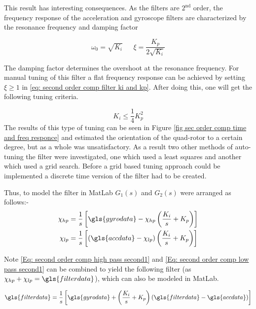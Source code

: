 This result has interesting consequences. As the filters are $2^{\mathrm{nd}}$ order, the frequency response of the acceleration and gyroscope filters are characterized by the resonance frequency and damping factor

\begin{equation}
	\omega_0 = \sqrt{K_i}~~~~~~~ \xi = \frac{K_p}{2\sqrt{K_i}}
	\label{eq: second order comp filter ki and kp}
\end{equation}


The damping factor determines the overshoot at the resonance frequency. For manual tuning of this filter a flat frequency response can be achieved by setting $\xi \geq 1$ in \eqref{eq: second order comp filter ki and kp}. After doing this, one will get the following tuning criteria. 

\begin{equation}
	K_i \leq \frac{1}{4}K_p^2
\end{equation}
The results of this type of tuning can be seen in Figure \ref{fig sec order comp time and freq responce} and estimated the orientation of the quad-rotor to a certain degree, but as a whole was unsatisfactory. As a result two other methods of auto-tuning the filter were investigated, one which used a least squares and another which used a grid search. Before a grid based tuning approach could be implemented a discrete time version of the filter had to be created. 

Thus, to model the filter in MatLab $G_1(s)$ and $G_2(s)$ were arranged as follows:-
\begin{align}
	\chi_{hp} & = \frac{1}{s}\left[\gls{gyrodata} - \chi_{hp}\left({\frac{K_i}{s} + K_p}\right)\right] \label{Eq: second order comp high pass second1} \\
	\chi_{lp} & = \frac{1}{s}\left[(\gls{accdata} - \chi_{lp})\left({\frac{K_i}{s} + K_p}\right)\right] \label{Eq: second order comp low pass second1}
\end{align}


Note \eqref{Eq: second order comp high pass second1} and \eqref{Eq: second order comp low pass second1} can be combined to yield the following filter (as $\chi_{hp} + \chi_{lp} =  \gls{filterdata} $), which can also be modeled in MatLab.

\begin{equation}
	\gls{filterdata}  = \frac{1}{s}\left[\gls{gyrodata} +\left({\frac{K_i}{s} + K_p}\right)(\gls{filterdata}   - \gls{accdata})\right] \label{eq: comp filter equation used to tune comp filter1}
\end{equation}

